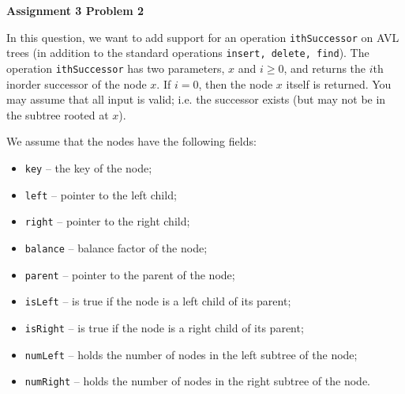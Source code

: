 \documentclass[12pt]{article}
\begin{document}
	
	\begin{center}
		{\Large\bf Assignment 3 Problem 2}\\
		\vspace{3mm}
	\end{center}
	
	\def\question#1{\item[\bf #1.]}
	\def\part#1{\item[\bf #1)]}
	\newcommand{\pc}[1]{\mbox{\textbf{#1}}} %
	
	
	
	
	In this question, we want to add support for an operation {\tt ithSuccessor} on AVL trees (in addition to the standard operations {\tt insert, delete, find}).
	The operation {\tt ithSuccessor} has two parameters, $x$ and $i \ge 0$, and returns the $i$th inorder successor of the node $x$.
	If $i = 0$, then the node $x$ itself is returned.
	You may assume that all input is valid; i.e. the successor exists (but may not be in the subtree rooted at $x$).
	
	We assume that the nodes have the following fields:
	\begin{itemize}
		\item {\tt key} -- the key of the node;
		\item {\tt left} -- pointer to the left child;
		\item {\tt right} -- pointer to the right child;
		\item {\tt balance} -- balance factor of the node;
		\item {\tt parent} -- pointer to the parent of the node;
		\item {\tt isLeft} -- is true if the node is a left child of its parent;
		\item {\tt isRight} -- is true if the node is a right child of its parent;
		\item {\tt numLeft} -- holds the number of nodes in the left subtree of the node;
		\item {\tt numRight} -- holds the number of nodes in the right subtree of the node.
	\end{itemize}
	
	\medskip
	
\end{document}
